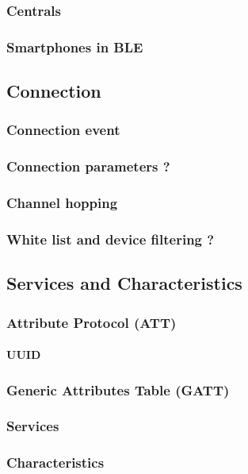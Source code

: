 \subsubsection{Centrals}
\subsubsection{Smartphones in BLE}

\subsection{Connection}
\subsubsection{Connection event}
\subsubsection{Connection parameters ?}
\subsubsection{Channel hopping}
\subsubsection{White list and device filtering ?}


\subsection{Services and Characteristics}
\subsubsection{Attribute Protocol (ATT)}
\paragraph{UUID}
\subsubsection{Generic Attributes Table (GATT)}
\subsubsection{Services}
\subsubsection{Characteristics}
